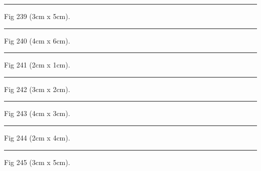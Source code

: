 \documentclass[a4paper,11pt]{article}
\begin{document}
\begin{swarmwrap}%
  \begin{minipage}[t]{3cm}
    \centering
    \rule{\linewidth}{5cm}
    {\footnotesize Fig 239 (3cm x 5cm).}
  \end{minipage}%
\end{swarmwrap}%
\swarmwrapnext
\lipsum[89]%

\begin{swarmwrap}%
  \begin{minipage}[t]{4cm}
    \centering
    \rule{\linewidth}{6cm}
    {\footnotesize Fig 240 (4cm x 6cm).}
  \end{minipage}%
\end{swarmwrap}%
\swarmwrapnext
\lipsum[90]%

\begin{swarmwrap}%
  \begin{minipage}[t]{2cm}
    \centering
    \rule{\linewidth}{1cm}
    {\footnotesize Fig 241 (2cm x 1cm).}
  \end{minipage}%
\end{swarmwrap}%
\swarmwrapnext
\lipsum[91]%

\begin{swarmwrap}%
  \begin{minipage}[t]{3cm}
    \centering
    \rule{\linewidth}{2cm}
    {\footnotesize Fig 242 (3cm x 2cm).}
  \end{minipage}%
\end{swarmwrap}%
\swarmwrapnext
\lipsum[92]%

\begin{swarmwrap}%
  \begin{minipage}[t]{4cm}
    \centering
    \rule{\linewidth}{3cm}
    {\footnotesize Fig 243 (4cm x 3cm).}
  \end{minipage}%
\end{swarmwrap}%
\swarmwrapnext
\lipsum[93]%

\begin{swarmwrap}%
  \begin{minipage}[t]{2cm}
    \centering
    \rule{\linewidth}{4cm}
    {\footnotesize Fig 244 (2cm x 4cm).}
  \end{minipage}%
\end{swarmwrap}%
\swarmwrapnext
\lipsum[94]%

\begin{swarmwrap}%
  \begin{minipage}[t]{3cm}
    \centering
    \rule{\linewidth}{5cm}
    {\footnotesize Fig 245 (3cm x 5cm).}
  \end{minipage}%
\end{swarmwrap}%
\swarmwrapnext
\lipsum[95]%
\end{document}
